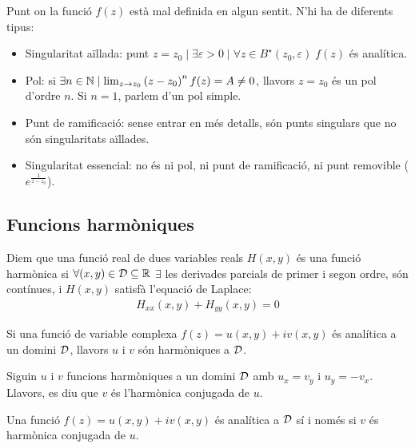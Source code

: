 \begin{defi}
    Punt on la funció $f(z)$ està mal definida en algun sentit. N'hi ha de diferents tipus:
    \begin{itemize}
        \item Singularitat aïllada: punt $z = z_{0} \mid \exists \varepsilon > 0 \mid \forall z \in B^{\star}(z_{0}, \varepsilon) \; f(z)$ és analítica.
        \item Pol: si $\exists n \in \mathbb{N} \mid \lim_{z \to z_{0}} \left( z - z_{0} \right)^{n} f(z) = A \neq 0$, llavors $z = z_{0}$ és un pol d'ordre $n$. Si $n = 1$, parlem d'un pol simple.
        \item Punt de ramificació: sense entrar en més detalls, són punts singulars que no són singularitats aïllades.
        \item Singularitat essencial: no és ni pol, ni punt de ramificació, ni punt removible ($e^{\frac{1}{z-z_{0}}}$).
    \end{itemize}
\end{defi}

\subsection{Funcions harmòniques}
\begin{defi}
    Diem que una funció real de dues variables reals $H(x,y)$ és una funció harmònica si $\forall (x,y) \in \mathcal{D} \subseteq \mathbb{R}$ $\exists$ les derivades parcials de primer i segon ordre, són contínues, i $H(x,y)$ satisfà l'equació de Laplace:
    \begin{align}
        H_{xx}(x,y) + H_{yy}(x,y) = 0
    \end{align}
\end{defi}

\begin{thm}
    Si una funció de variable complexa $f(z) = u(x,y) + iv(x,y)$ és analítica a un domini $\mathcal{D}$, llavors $u$ i $v$ són harmòniques a $\mathcal{D}$.
\end{thm}

\begin{defi}
        Siguin $u$ i $v$ funcions harmòniques a un domini $\mathcal{D}$ amb $u_{x} = v_{y}$ i $u_{y} = - v_{x}$. Llavors, es diu que $v$ és l'harmònica conjugada de $u$.
\end{defi}

\begin{thm}
    Una funció $f(z) = u(x,y) + iv(x,y)$ és analítica a $\mathcal{D}$ sí i només si $v$ és harmònica conjugada de $u$.
\end{thm}
